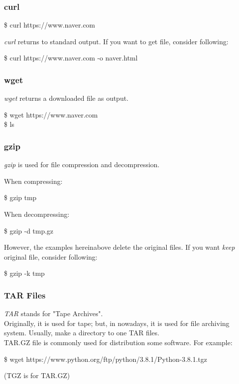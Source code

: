 \documentclass{beamer}
\begin{document}
	\begin{frame}
		\frametitle{curl}
		\begin{example}
			\$ curl https://www.naver.com
		\end{example}
		\textit{curl} returns to standard output. If you want to get file, consider following:
		\begin{example}
			\$ curl https://www.naver.com -o naver.html
		\end{example}
	\end{frame}

	\begin{frame}
		\frametitle{wget}
		\textit{wget} returns a downloaded file as output. 
		\begin{example}
			\$ wget https://www.naver.com \\
			\$ ls
		\end{example}
	\end{frame}

	\begin{frame}
		\frametitle{gzip}
		\textit{gzip} is used for file compression and decompression.
		
		When compressing:
		\begin{example}
			\$ gzip tmp
		\end{example}
	
		When decompressing:
		\begin{example}
			\$ gzip -d tmp.gz
		\end{example}
	
		However, the examples hereinabove delete the original files. If you want \textit{keep} original file, consider following:
		\begin{example}
			\$ gzip -k tmp
		\end{example}
	\end{frame}

	\begin{frame}
		\frametitle{TAR Files}
		\textit{TAR} stands for "Tape Archives". \\
		Originally, it is used for tape; but, in nowadays, it is used for file archiving system. Usually, make a directory to one TAR files. \\
		TAR.GZ file is commonly used for distribution some software. For example:
		\begin{example}
			\$ wget https://www.python.org/ftp/python/3.8.1/Python-3.8.1.tgz
		\end{example}
		(TGZ is for TAR.GZ)
	\end{frame}
\end{document}
